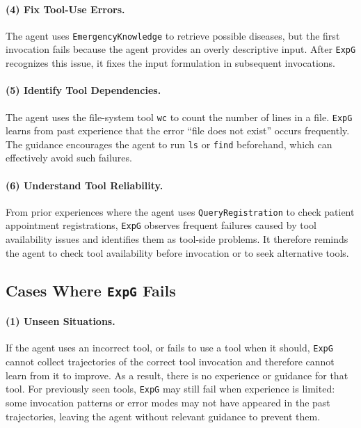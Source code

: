 \documentclass[11pt]{article}
\newcommand{\ours}{\texttt{ExpG}}
\begin{document}
\paragraph{(4) Fix Tool-Use Errors.}
The agent uses \texttt{EmergencyKnowledge} to retrieve possible diseases, but the first invocation fails because the agent provides an overly descriptive input. After {\ours} recognizes this issue, it fixes the input formulation in subsequent invocations.

\paragraph{(5) Identify Tool Dependencies.}
The agent uses the file-system tool \texttt{wc} to count the number of lines in a file. {\ours} learns from past experience that the error ``file does not exist'' occurs frequently. The guidance encourages the agent to run \texttt{ls} or \texttt{find} beforehand, which can effectively avoid such failures. 

\paragraph{(6) Understand Tool Reliability.}
From prior experiences where the agent uses \texttt{QueryRegistration} to check patient appointment registrations, {\ours} observes frequent failures caused by tool availability issues and identifies them as tool-side problems. It therefore reminds the agent to check tool availability before invocation or to seek alternative tools. 

\subsection{Cases Where {\ours} Fails}

\paragraph{(1) Unseen Situations.}
If the agent uses an incorrect tool, or fails to use a tool when it should, {\ours} cannot collect trajectories of the correct tool invocation and therefore cannot learn from it to improve. As a result, there is no experience or guidance for that tool. For previously seen tools, {\ours} may still fail when experience is limited: some invocation patterns or error modes may not have appeared in the past trajectories, leaving the agent without relevant guidance to prevent them.
\end{document}
